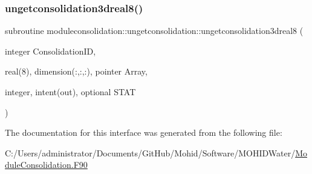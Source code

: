 \mbox{\label{interfacemoduleconsolidation_1_1ungetconsolidation_a300c416b5932aa76e437f0f9dbea7d88}} 
\subsubsection{\texorpdfstring{ungetconsolidation3dreal8()}{ungetconsolidation3dreal8()}}
{\footnotesize\ttfamily subroutine moduleconsolidation\+::ungetconsolidation\+::ungetconsolidation3dreal8 (\begin{DoxyParamCaption}\item[{integer}]{Consolidation\+ID,  }\item[{real(8), dimension(\+:,\+:,\+:), pointer}]{Array,  }\item[{integer, intent(out), optional}]{S\+T\+AT }\end{DoxyParamCaption})\hspace{0.3cm}{\ttfamily [private]}}



The documentation for this interface was generated from the following file\+:\begin{DoxyCompactItemize}
\item 
C\+:/\+Users/administrator/\+Documents/\+Git\+Hub/\+Mohid/\+Software/\+M\+O\+H\+I\+D\+Water/\mbox{\hyperlink{_module_consolidation_8_f90}{Module\+Consolidation.\+F90}}\end{DoxyCompactItemize}
